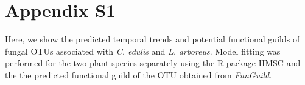 \section{Appendix S1}
Here, we show the predicted temporal trends and potential functional guilds of fungal OTUs associated with \textit{C. edulis} and \textit{L. arboreus}. Model fitting was performed for the two plant species separately using the R package HMSC and the the predicted functional guild of the OTU obtained from \textit{FunGuild}.


